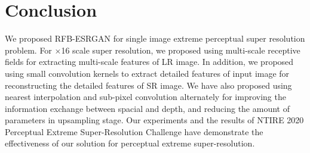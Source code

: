 \documentclass[10pt,twocolumn,letterpaper]{article}
\begin{document}
\section{Conclusion}
We proposed RFB-ESRGAN for single image extreme perceptual super resolution problem. For $\times$16 scale super resolution, we proposed using multi-scale receptive fields for extracting multi-scale features of LR image. In addition, we proposed using small convolution kernels to extract detailed features of input image for reconstructing the detailed features of SR image. We have also proposed using nearest interpolation and sub-pixel convolution alternately for improving the information exchange between spacial and depth, and reducing the amount of parameters in upsampling stage. Our experiments and the results of NTIRE 2020 Perceptual Extreme Super-Resolution Challenge have demonstrate the effectiveness of our solution for perceptual extreme super-resolution.


{\small


}
\end{document}
